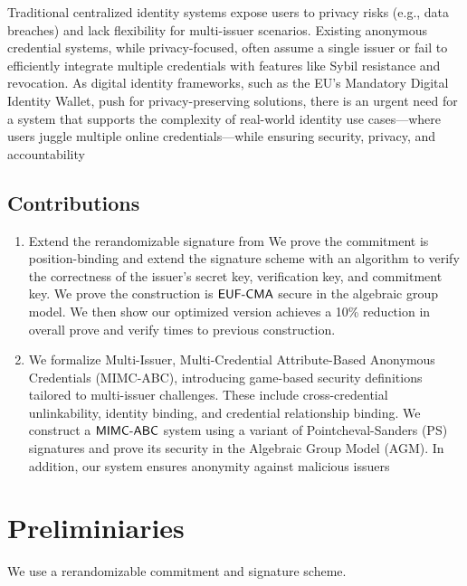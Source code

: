 Traditional centralized identity systems expose users to privacy risks (e.g., data breaches) and lack flexibility for multi-issuer scenarios. Existing anonymous credential systems, while privacy-focused, often assume a single issuer or fail to efficiently integrate multiple credentials with features like Sybil resistance and revocation. As digital identity frameworks, such as the EU’s Mandatory Digital Identity Wallet, push for privacy-preserving solutions, there is an urgent need for a system that supports the complexity of real-world identity use cases—where users juggle multiple online credentials—while ensuring security, privacy, and accountability


\subsection{Contributions}

\begin{enumerate}
    \item Extend the rerandomizable signature from \cite{tomescu2022utt} 
    We prove the commitment is position-binding and extend the signature scheme with an algorithm to verify the correctness of the issuer's secret key, verification key, and commitment key. We prove the construction is $\mathsf{EUF\text{-}CMA}$ secure in the algebraic group model. We then show our optimized version achieves a 10\% reduction in overall prove and verify times to previous construction. 
    
    \item We formalize Multi-Issuer, Multi-Credential Attribute-Based Anonymous Credentials (MIMC-ABC), introducing game-based security definitions tailored to multi-issuer challenges. These include cross-credential unlinkability, identity binding, and credential relationship binding. We construct a $\mathsf{MIMC\text{-}ABC}$ system using a variant of Pointcheval-Sanders (PS) signatures and prove its security in the Algebraic Group Model (AGM). In addition, our system ensures anonymity against malicious issuers

\end{enumerate}







\section{Preliminiaries}
We use a rerandomizable commitment and signature scheme. 


